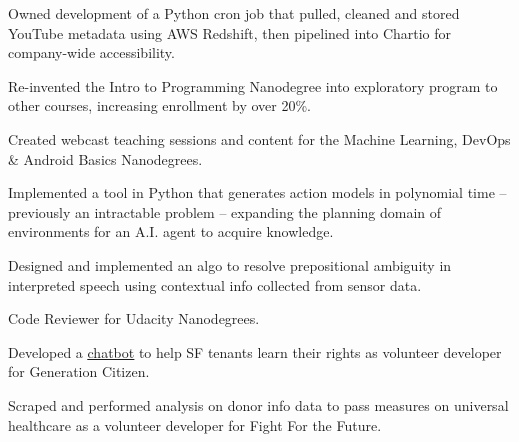 \documentclass[]{deedy-resume-openfont}
\begin{document}
\begin{minipage}[t]{0.66\textwidth}
\begin{tightemize}
\item Owned development of a Python cron job that pulled, cleaned and stored YouTube metadata using AWS Redshift, then pipelined into Chartio for company-wide accessibility.
\item Re-invented the Intro to Programming Nanodegree into exploratory program to other courses, increasing enrollment by over 20\%.
\item Created webcast teaching sessions and content for the Machine Learning, DevOps \& Android Basics Nanodegrees.

\end{tightemize}
\sectionsep

\begin{tightemize}
\item Implemented a tool in Python that generates action models in polynomial time -- previously an intractable problem -- expanding the planning domain of environments for an A.I. agent to acquire knowledge.
\item Designed and implemented an algo to resolve prepositional ambiguity in interpreted speech using contextual info collected from sensor data.
\end{tightemize}
\sectionsep

\begin{tightemize}
\item Code Reviewer for Udacity Nanodegrees.
\item Developed a \color{blue}\underline{\href{https://github.com/rahul-nath/rentbot}{\color{blue}chatbot}} to help SF tenants learn their rights as volunteer developer for Generation Citizen.
\item Scraped and performed analysis on donor info data to pass measures on universal healthcare as a volunteer developer for Fight For the Future.
\end{tightemize}



\end{minipage}
\end{document}
